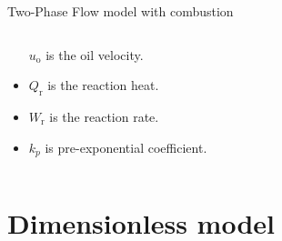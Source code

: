 \documentclass[
    8pt,
    aspectratio=1610,
    c,
    intlimits,
    leqno,
    professionalfonts,
]{beamer}
\begin{document}
\begin{frame}
\begin{block}{Two-Phase Flow model with combustion~\cite{Gargar2020}}
\begin{columns}
\begin{column}{.3\paperwidth}
\begin{itemize}
					      $u_{\text{o}}$ is the oil velocity.

					\item

					      $Q_{\text{r}}$ is the reaction heat.

					\item

					      $W_{\text{r}}$ is the reaction rate.

					\item

					      $k_{p}$ is pre-exponential coefficient.
				\end{itemize}
			\end{column}
		\end{columns}
	\end{block}
\end{frame}

\section{Dimensionless model}
\end{document}
